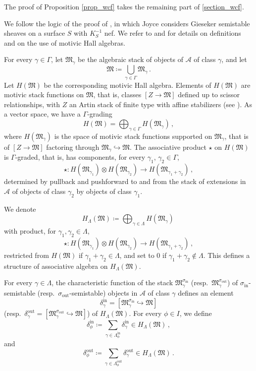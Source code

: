 \documentclass[12pt, a4paper]{amsart}
\newcommand\cA{\mathcal A}
\newcommand\fM{\mathfrak M}
\newcommand\iin{\mathrm{in}}
\newcommand\oout{\mathrm{out}}
\begin{document}
The proof of Proposition \ref{prop_wcf} takes the remaining part of
\cref{section_wcf}.

We follow the logic of the proof of
\cite[Proposition 6.20]{MR2357325},
in which Joyce considers Gieseker semistable sheaves on a surface $S$ with $K_S^{-1}$ nef.
We refer to \cite{MR2854172} and 
\cite{MR2303235} for details on definitions and on the use of motivic Hall algebras.

For every $\gamma \in \Gamma$, let 
$\fM_\gamma$ be the algebraic stack of objects of $\cA$ of class $\gamma$, and let 
\[ \fM \coloneq \bigcup_{\gamma \in \Gamma} \fM_\gamma \,.\]
Let $H(\fM)$ be the corresponding 
motivic Hall algebra. Elements of $H(\fM)$ are motivic stack functions on $\fM$, that is, classes
$[Z \rightarrow \fM]$ defined 
up to scissor relationships, with
$Z$ an Artin stack of finite type with affine stabilizers (see \cite{MR2854172}).  As a vector space, we have a $\Gamma$-grading
\[ H(\fM)=\bigoplus_{\gamma \in \Gamma}
H(\fM_\gamma) \,,\]
where $H(\fM_\gamma)$ is the space of motivic stack functions supported on
$\fM_\gamma$, that is of $[Z \rightarrow \fM]$ factoring through $\fM_\gamma \hookrightarrow \fM$.
The associative product $\star$ on 
$H(\fM)$ is $\Gamma$-graded, that is,
has components, for every $\gamma_1$, $\gamma_2 \in \Gamma$,
\[ \star \colon H(\fM_{\gamma_1}) \otimes H(\fM_{\gamma_2}) \rightarrow H(\fM_{\gamma_1+\gamma_2})\,,\]
determined by pullback and pushforward to and from the stack of extensions in $\cA$ of objects of class $\gamma_2$ by objects of class $\gamma_1$. 

We denote 
\[ H_\Lambda(\fM) \coloneq \bigoplus_{\gamma \in \Lambda} H(\fM_\gamma)\,\]
with product, for $\gamma_1, \gamma_2 \in \Lambda$, 
\[ \star \colon H(\fM_{\gamma_1}) \otimes H(\fM_{\gamma_2}) \rightarrow H(\fM_{\gamma_1+\gamma_2})\,,\]
restricted from $H(\fM)$ if $\gamma_1+\gamma_2 \in \Lambda$, and set to $0$ if $\gamma_1+\gamma_2 \notin \Lambda$. This defines a structure of associative algebra on
$H_\Lambda(\fM)$.

For every $\gamma \in \Lambda$, the characteristic function of the stack
$\fM_\gamma^{\sigma_\iin}$ (resp.\ 
$\fM_\gamma^{\sigma_\oout}$)
of $\sigma_\iin$-semistable 
(resp.\ $\sigma_\oout$-semistable) objects in $\cA$ of class $\gamma$ defines an element
\[\delta_\gamma^{\iin}
=[\fM_\gamma^{\sigma_\iin} \hookrightarrow \fM]\] 
(resp.\ 
$\delta_\gamma^{\oout}=[\fM_\gamma^{\sigma_\oout} \hookrightarrow \fM]$) of $H_\Lambda(\fM)$. For every $\phi \in I$, we define 
\[ \delta_\phi^{\iin} 
\coloneq \sum_{\gamma \in \Lambda_\phi^\iin} \delta_\gamma^{\iin} \in H_\Lambda(\fM) \,,\]
and 
\[ \delta_\phi^{\oout} 
\coloneq \sum_{\gamma \in \Lambda_\phi^\oout} \delta_\gamma^{\oout} \in H_\Lambda(\fM) \,.\]
\end{document}
